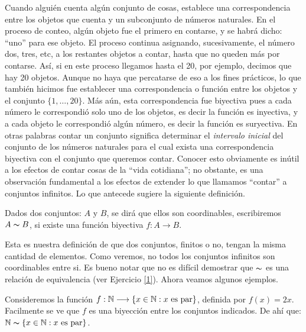  Cuando
alguién cuenta algún conjunto de cosas, establece una
correspondencia entre los objetos que cuenta y un subconjunto de
números naturales. En el proceso de conteo,
algún objeto fue el primero en contarse, y se habrá dicho:
``uno'' para ese objeto. El proceso continua asignando,
sucesivamente, el número dos, tres, etc, a los restantes objetos
a contar, hasta que no queden más por contarse. Así, si en
este proceso llegamos hasta el 20, por ejemplo, decimos que hay 20
objetos. Aunque no haya que percatarse de eso a los fines
prácticos, lo que también hicimos fue establecer una
correspondencia o función entre los objetos y el conjunto
$\{1,\dots,20\}$. Más aún, esta correspondencia fue biyectiva
pues a cada número le correspondió solo uno de los objetos, es decir la función es inyectiva, y a cada objeto le
correspondió algún número, es decir  la función es
suryectiva. En otras palabras contar un conjunto significa
determinar el  \emph{intervalo inicial} del conjunto de los
números naturales para el cual exista una correspondencia biyectiva
con el conjunto que queremos contar. Conocer esto obviamente es
inútil a los efectos de contar cosas de la ``vida cotidiana'';
no obstante, es una observación fundamental a los efectos de
extender lo que llamamos ``contar'' a conjuntos infinitos. Lo que
antecede sugiere la siguiente definición.
\begin{definicion}\label{defcoordinables} Dados dos conjuntos: $A$ y $B$,
se dirá que ellos son coordinables, escribiremos $A\thicksim B$,
si existe una función biyectiva $f:A\longrightarrow B$.
\end{definicion}

Esta es nuestra definición de que dos conjuntos, finitos o
no, tengan la misma cantidad de elementos. Como veremos, no
todos los  conjuntos infinitos son coordinables entre si. 
Es bueno notar que no es difícil demostrar que $\thicksim$ es
una relación de equivalencia (ver Ejercicio \vref{1}).
 Ahora
veamos algunos ejemplos.

\begin{ejemplo}Consideremos la función
$f:\mathbb{N}\longrightarrow\{x\in\mathbb{N}:x\,\,\text{es par}\}$, definida por
$f(x)=2x$. Facilmente se ve que $f$ es una biyección entre los
conjuntos indicados. De ahí que:
$\mathbb{N}\thicksim\{x\in\mathbb{N}:x\,\,\text{es par}\}$.
\end{ejemplo}

